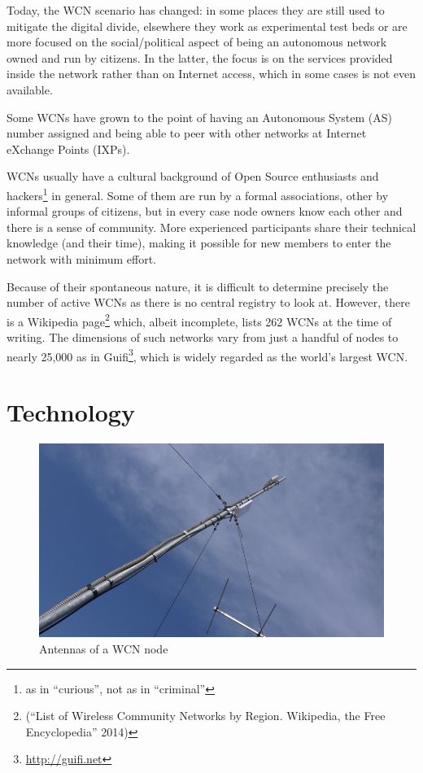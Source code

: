 \documentclass[a4paper,11pt,twoside,openleft]{memoir}
\begin{document}
Today, the WCN scenario has changed: in some places they are still used to
mitigate the digital divide, elsewhere they work as experimental
test beds or are more focused on the social/political aspect of being an
autonomous network owned and run by citizens. In the latter, the focus
is on the services provided inside the network rather than on Internet
access, which in some cases is not even available.

Some WCNs have grown to
the point of having an Autonomous System (AS) number assigned and being able to
peer with other networks at Internet eXchange Points (IXPs).

WCNs usually have a cultural background of Open Source enthusiasts and
hackers\footnote{as in ``curious'', not as in ``criminal''} in general.
Some of them are run by a formal associations, other by informal groups
of citizens, but in every case node owners know each other and there is
a sense of community. More experienced participants share their
technical knowledge (and their time), making it possible for new members
to enter the network with minimum effort.

Because of their spontaneous nature, it is difficult to
determine precisely the number of active WCNs as there is no central
registry to look at. However, there is a Wikipedia page\footnote{(``List
  of Wireless Community Networks by Region. Wikipedia, the Free
  Encyclopedia'' 2014)} which, albeit incomplete, lists 262 WCNs at the
time of writing. The dimensions of such networks vary from just a
handful of nodes to nearly 25,000 as in Guifi\footnote{\url{http://guifi.net}},
which is widely regarded as the world's largest WCN.

\section{Technology}\label{technology}

\begin{figure}[htbp]
\centering
\includegraphics{images/ninux_node.png}
\caption{Antennas of a WCN node}
\end{figure}
\end{document}
